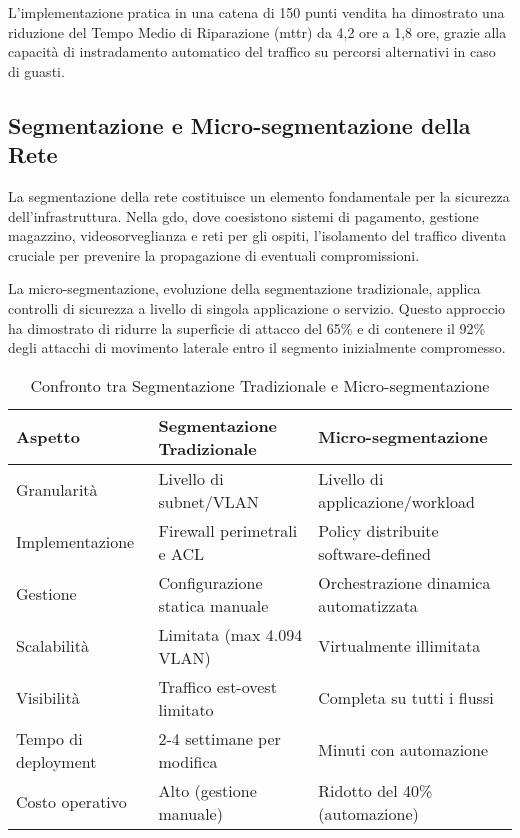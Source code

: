 L'implementazione pratica in una catena di 150 punti vendita ha dimostrato una riduzione del Tempo Medio di Riparazione (\gls{mttr}) da 4,2 ore a 1,8 ore, grazie alla capacità di instradamento automatico del traffico su percorsi alternativi in caso di guasti\autocite{NetworkWorld2024}.

\subsection{Segmentazione e Micro-segmentazione della Rete}
\label{subsec:segmentazione}

La segmentazione della rete costituisce un elemento fondamentale per la sicurezza dell'infrastruttura. Nella \gls{gdo}, dove coesistono sistemi di pagamento, gestione magazzino, videosorveglianza e reti per gli ospiti, l'isolamento del traffico diventa cruciale per prevenire la propagazione di eventuali compromissioni\autocite{NIST2024}.

La micro-segmentazione, evoluzione della segmentazione tradizionale, applica controlli di sicurezza a livello di singola applicazione o servizio. Questo approccio ha dimostrato di ridurre la superficie di attacco del 65\% e di contenere il 92\% degli attacchi di movimento laterale entro il segmento inizialmente compromesso\autocite{Forrester2024zero}.

\begin{table}[htbp]
\centering
\caption{Confronto tra Segmentazione Tradizionale e Micro-segmentazione}
\label{tab:segmentation_comparison}
\small
\begin{tabularx}{\textwidth}{|X|X|X|}
\hline
\textbf{Aspetto} & \textbf{Segmentazione Tradizionale} & \textbf{Micro-segmentazione} \\
\hline
Granularità & Livello di subnet/VLAN & Livello di applicazione/workload \\
\hline
Implementazione & Firewall perimetrali e ACL & Policy distribuite software-defined \\
\hline
Gestione & Configurazione statica manuale & Orchestrazione dinamica automatizzata \\
\hline
Scalabilità & Limitata (max 4.094 VLAN) & Virtualmente illimitata \\
\hline
Visibilità & Traffico est-ovest limitato & Completa su tutti i flussi \\
\hline
Tempo di deployment & 2-4 settimane per modifica & Minuti con automazione \\
\hline
Costo operativo & Alto (gestione manuale) & Ridotto del 40\% (automazione) \\
\hline
\end{tabularx}
\end{table}

